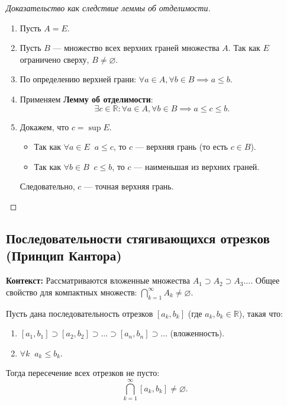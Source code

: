 \begin{proof}[Доказательство как следствие леммы об отделимости]
    \begin{enumerate}
        \item Пусть $A = E$.
        \item Пусть $B$ — множество всех верхних граней множества $A$. Так как $E$ ограничено сверху, $B \neq \varnothing$.
        \item По определению верхней грани: $\forall a \in A, \forall b \in B \implies a \le b$.
        \item Применяем \textbf{Лемму об отделимости}:
        \[ \exists c \in \mathbb{R}: \forall a \in A, \forall b \in B \implies a \le c \le b. \]
        \item Докажем, что $c = \sup E$.
        \begin{itemize}
            \item Так как $\forall a \in E \;\; a \le c$, то $c$ — верхняя грань (то есть $c \in B$).
            \item Так как $\forall b \in B \;\; c \le b$, то $c$ — наименьшая из верхних граней.
        \end{itemize}
        Следовательно, $c$ — точная верхняя грань.
    \end{enumerate}
\end{proof}

\newpage

\subsection{Последовательности стягивающихся отрезков (Принцип Кантора)}

\textbf{Контекст:} Рассматриваются вложенные множества $A_1 \supset A_2 \supset A_3 \dots$. Общее свойство для компактных множеств: $\bigcap_{k=1}^\infty A_k \neq \varnothing$.

\begin{theorem}
    Пусть дана последовательность отрезков $[a_k, b_k]$ (где $a_k, b_k \in \mathbb{R}$), такая что:
    \begin{enumerate}
        \item $[a_1, b_1] \supset [a_2, b_2] \supset \dots \supset [a_n, b_n] \supset \dots$ (вложенность).
        \item $\forall k \;\; a_k \le b_k$.
    \end{enumerate}
    Тогда пересечение всех отрезков не пусто:
    \[ \bigcap_{k=1}^\infty [a_k, b_k] \neq \varnothing. \]
\end{theorem}

